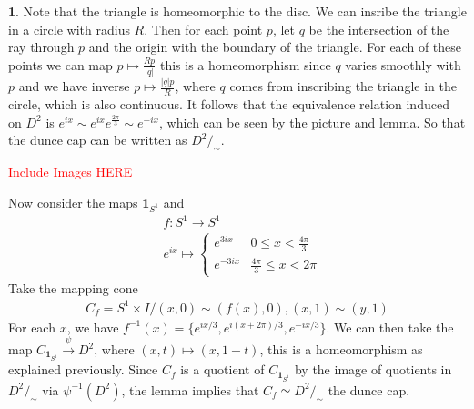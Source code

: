 \documentclass[10.5pt]{article}
\theoremstyle{definition}
\newtheorem{pb}{}
\newcommand{\set}[1]{\{#1\}}
\newcommand{\abs}[1]{\lvert#1\rvert}
\newcommand{\ism}{\simeq}
\begin{document}
    \begin{pb}
        Note that the triangle is homeomorphic to the disc. We can insribe the triangle in a circle with radius \(R\). Then for each point \(p\), let \(q\) be the intersection
        of the ray through \(p \) and the origin with the boundary of the triangle. For each of these points we can map \(p \mapsto \frac{Rp }{\abs{q }}\) this is a homeomorphism
        since \(q\) varies smoothly with \(p\) and we have inverse \(p \mapsto \frac{\abs{q}p}{R}\), where \(q\) comes from inscribing the triangle in the circle, which is also continuous.
        It follows that the equivalence relation induced on \(D^2\) is \(e^{ix} \sim e^{ix}e^{\frac{2\pi}{3}} \sim e^{-ix}\), which can be seen by the picture and lemma. So that
        the dunce cap can be written as \(D^2/_\sim\).

        \textcolor{red}{Include Images HERE}

        Now consider the maps \(\mathbf{1}_{S^1}\) and
        \begin{align*}
            &f:S^1 \to S^1 \\
            &e^{ix} \mapsto \begin{cases}
                e^{3ix} & 0 \leq x < \frac{4\pi}{3} \\
                e^{-3ix} & \frac{4\pi}{3} \leq x < 2\pi
            \end{cases}
        \end{align*}
        Take the mapping cone 
        \begin{align*}
            C_f = S^1 \times I / (x,0) \sim (f(x),0), (x,1) \sim (y,1)
        \end{align*}
        For each \(x\), we have \(f^{-1}(x) = \set{e^{ix/3},e^{i(x + 2\pi)/3},e^{-ix/3}}\). We can then take the map \(C_{\mathbf{1}_{S^1}} \overset{\psi}{\to} D^2\), where \((x,t) \mapsto (x,1-t)\), this is a homeomorphism as explained previously. 
        Since \(C_f\) is a quotient of \(C_{\mathbf{1}_{S^1}}\) by the image of quotients in \(D^2/_\sim\) via \(\psi^{-1}(D^2)\), the lemma implies that \(C_f \ism D^2/_\sim\) the dunce cap.


\end{pb}
\end{document}
